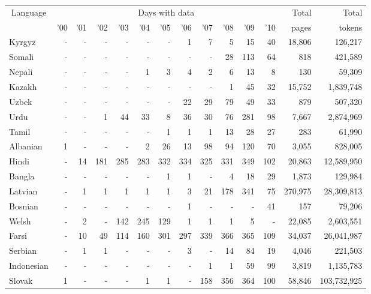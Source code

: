 \documentclass{article}
\begin{document}
\begin{table}[h!]
\setlength{\tabcolsep}{0.7ex}
\footnotesize
\begin{center}
\begin{tabular}{l|rrrrrrrrrrr|rr}
\multicolumn{1}{c}{Language}		&	\multicolumn{11}{c}{Days with data}	&	Total	&	Total	\\
\cline{2-12}
	&	'00	&	'01	&	'02		&	'03	&	'04		&	'05		&	'06	&	'07	&	'08	&	'09	&	'10	&	pages	&	tokens\\
\hline
Kyrgyz	&	-	&	-	&	-	&	-	&	-	&	-	&	1	&	7	&	5	&	15	&	40	&	18,806	&	126,217\\
Somali	&	-	&	-	&	-	&	-	&	-	&	-	&	-	&	-	&	28	&	113	&	64	&	818	&	421,589\\
Nepali	&	-	&	-	&	-	&	-	&	1	&	3	&	4	&	2	&	6	&	13	&	8	&	130	&	59,309\\
Kazakh	&	-	&	-	&	-	&	-	&	-	&	-	&	-	&	-	&	1	&	45	&	32	&	15,752	&	1,839,748\\
Uzbek	&	-	&	-	&	-	&	-	&	-	&	-	&	22	&	29	&	79	&	49	&	33	&	879	&	507,320\\
Urdu	&	-	&	-	&	1	&	44	&	33	&	8	&	36	&	30	&	76	&	281	&	98	&	7,667	&	2,874,969\\
Tamil	&	-	&	-	&	-	&	-	&	-	&	1	&	1	&	1	&	13	&	28	&	27	&	283	&	61,990\\
Albanian	&	1	&	-	&	-	&	-	&	2	&	26	&	13	&	98	&	94	&	120	&	70	&	3,055	&	828,005\\
Hindi	&	-	&	14	&	181	&	285	&	283	&	332	&	334	&	325	&	331	&	349	&	102	&	20,863	&	12,589,950\\
Bangla	&	-	&	-	&	-	&	-	&	-	&	1	&	1	&	-	&	4	&	18	&	29	&	1,873	&	129,984\\
Latvian	&	-	&	1	&	1	&	1	&	1	&	1	&	3	&	21	&	178	&	341	&	75	&	270,975	&	28,309,813\\
Bosnian	&	-	&	-	&	-	&	-	&	-	&	-	&	1	&	-	&	-	&	-	&	41	&	157	&	79,206\\
Welsh	&	-	&	2	&	-	&	142	&	245	&	129	&	1	&	1	&	1	&	5	&	-	&	22,085	&	2,603,551\\
Farsi	&	-	&	10	&	49	&	114	&	160	&	301	&	297	&	339	&	366	&	365	&	109	&	34,037	&	26,041,987\\
Serbian	&	-	&	1	&	1	&	-	&	-	&	-	&	3	&	-	&	14	&	84	&	19	&	4,046	&	221,503\\
Indonesian	&	-	&	-	&	-	&	-	&	-	&	-	&	-	&	1	&	1	&	59	&	99	&	3,819	&	1,135,783\\
Slovak	&	1	&	-	&	-	&	-	&	1	&	1	&	-	&	158	&	356	&	364	&	100	&	58,846	&	103,732,925\\

\end{tabular}
\end{center}
\end{table}
\end{document}
